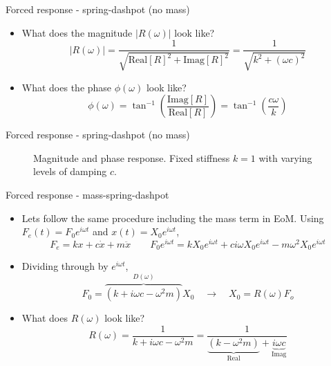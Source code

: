 \documentclass[11pt,aspectratio=169,handout]{beamer}
\begin{document}
\begin{frame}[c]{Forced response - spring-dashpot (no mass)}
\begin{itemize}
	\item<1-> What does the magnitude $|R(\omega)|$ look like? 
	\begin{equation}
		|R(\omega)| = \frac{1}{\sqrt{\mbox{Real}[R]^2 + \mbox{Imag}[R]^2}} =  \frac{1}{\sqrt{k^2 + (\omega c)^2}} 
	\end{equation}
\vspace{1cm}
	\item<2-> What does the phase $\phi(\omega)$ look like?
	\begin{equation}
		\phi(\omega) = \tan^{-1}\left(\frac{\mbox{Imag}[R]}{\mbox{Real}[R]}\right) = \tan^{-1}\left(\frac{c\omega}{k}\right)
	\end{equation}
\end{itemize}
\end{frame}

\begin{frame}[c]{Forced response - spring-dashpot (no mass)}
	\begin{figure}
		
		\caption{Magnitude and phase response. Fixed stiffness $k=1$ with varying levels of damping $c$.}
	\end{figure}
\end{frame}


\begin{frame}[c]{Forced response - mass-spring-dashpot}
	\begin{itemize}
		\item<1-> Lets follow the same procedure including the mass term in EoM. Using $F_e(t) = F_0 e^{i\omega t}$ and $x(t) = X_0 e^{i\omega t}$,
		\begin{equation}\label{}
			F_e =  kx + c\dot{x} +  m\ddot{x} \quad \quad F_0 e^{i\omega t} = k X_0 e^{i\omega t} + ci\omega X_0 e^{i\omega t} - m\omega^2 X_0 e^{i\omega t}
		\end{equation}
	\item<2-> Dividing through by $e^{i\omega t}$,
	\begin{equation}
		 F_0 = \overbrace{(k + i\omega c - \omega^2 m)}^{D(\omega)}X_0 \quad \rightarrow \quad X_0 = R(\omega) F_o
	\end{equation}
		\item<3-> What does $R(\omega)$ look like?
\begin{equation}
	R(\omega) = \frac{1}{k + i\omega c - \omega^2 m} =  \frac{1}{\underbrace{(k - \omega^2 m)}_{\mbox{Real}}+ \underbrace{i\omega c}_{\mbox{Imag}} } 
\end{equation}
	\end{itemize}
\end{frame}
\end{document}
